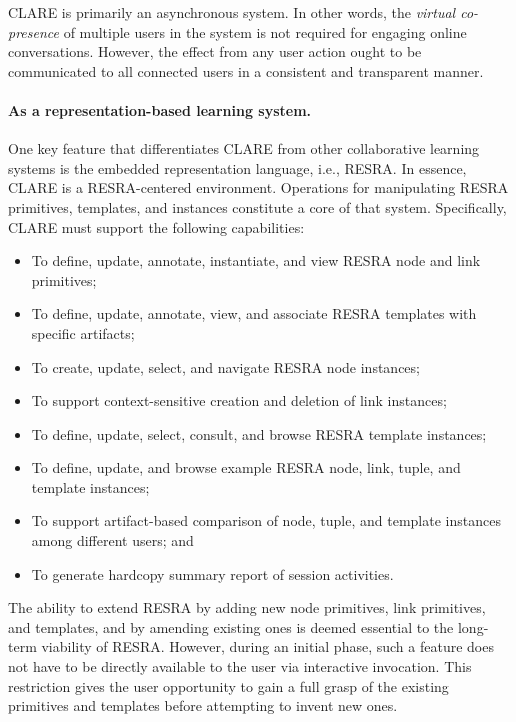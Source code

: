 CLARE is primarily an asynchronous system. In other words, the {\it virtual
co-presence\/} of multiple users in the system is not required for engaging
online conversations. However, the effect from any user action ought to be
communicated to all connected users in a consistent and transparent manner.


\paragraph{As a representation-based learning system.}

One key feature that differentiates CLARE from other collaborative learning
systems is the embedded representation language, i.e., RESRA. In essence,
CLARE is a RESRA-centered environment. Operations for manipulating RESRA
primitives, templates, and instances constitute a core of that system.
Specifically, CLARE must support the following capabilities:

\begin{itemize}
\item To define, update, annotate, instantiate, and view RESRA node and
  link primitives;
  
\item To define, update, annotate, view, and associate RESRA templates with
  specific artifacts;
  
\item To create, update, select, and navigate RESRA node instances;
  
\item To support context-sensitive creation and deletion of link instances;
  
\item To define, update, select, consult, and browse RESRA template
  instances;
  
\item To define, update, and browse example RESRA node, link, tuple, and
  template instances;
  
\item To support artifact-based comparison of node, tuple, and template
  instances among different users; and
  
\item To generate hardcopy summary report of session activities.
\end{itemize}

The ability to extend RESRA by adding new node primitives, link primitives,
and templates, and by amending existing ones is deemed essential to the
long-term viability of RESRA. However, during an initial phase, such a
feature does not have to be directly available to the user via interactive
invocation. This restriction gives the user opportunity to gain a full
grasp of the existing primitives and templates before attempting to invent
new ones.


